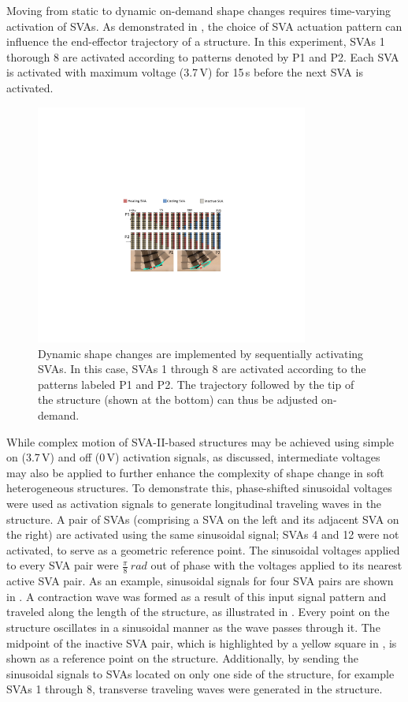Moving from static to dynamic on-demand shape changes requires time-varying activation of SVAs.
As demonstrated in , the choice of SVA actuation pattern can influence the end-effector trajectory of a structure. In this experiment, SVAs 1 thorough 8 are activated according to patterns denoted by P1 and P2. Each SVA is activated with maximum voltage (3.7\,V) for 15\,s before the next SVA is activated.
\begin{figure}[!ht]
\centering
\includegraphics[width=0.8\textwidth]{armTrajOnOff.pdf}
\caption[]{Dynamic shape changes are implemented by sequentially activating SVAs. In this case, SVAs 1 through 8 are activated according to the patterns labeled P1 and P2. The trajectory followed by the tip of the structure (shown at the bottom) can thus be adjusted on-demand.}
\label{fig:armTrajOnOff}
\end{figure}

While complex motion of SVA-II-based structures may be achieved using simple on (3.7\,V) and off (0\,V) activation signals, as discussed, intermediate voltages may also be applied to further enhance the complexity of shape change in soft heterogeneous structures. To demonstrate this, phase-shifted sinusoidal voltages were used as activation signals to generate longitudinal traveling waves in the structure. A pair of SVAs (comprising a SVA on the left and its adjacent SVA on the right) are activated using the same sinusoidal signal; SVAs 4 and 12 were not activated, to serve as a geometric reference point. The sinusoidal voltages applied to every SVA pair were $\frac{\pi}{8}~rad$ out of phase with the voltages applied to its nearest active SVA pair. As an example, sinusoidal signals for four SVA pairs are shown in  . A contraction wave was formed as a result of this input signal pattern and traveled along the length of the structure, as illustrated in . Every point on the structure oscillates in a sinusoidal manner as the wave passes through it. The midpoint of the inactive SVA pair, which is highlighted by a yellow square in , is shown as a reference point on the structure. Additionally, by sending the sinusoidal signals to SVAs located on only one side of the structure, for example SVAs 1 through 8, transverse traveling waves were generated in the structure.

